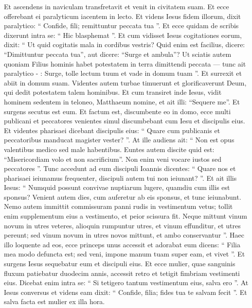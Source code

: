 \begin{biblechapter}
\begin{biblechapter}
\begin{biblechapter}
\begin{biblechapter}
\begin{biblechapter}
\begin{biblechapter}
\begin{biblechapter}
\begin{biblechapter}
\begin{biblechapter}
\verse Et ascendens in naviculam transfretavit et venit in civitatem suam. 
 \verse Et ecce offerebant ei paralyticum iacentem in lecto. Et videns Iesus fidem illorum, dixit paralytico: “ Confide, fili; remittuntur peccata tua ”. 
\verse Et ecce quidam de scribis dixerunt intra se: “ Hic blasphemat ”. 
\verse Et cum vidisset Iesus cogitationes eorum, dixit: “ Ut quid cogitatis mala in cordibus vestris? 
\verse Quid enim est facilius, dicere: “Dimittuntur peccata tua”, aut dicere: “Surge et ambula”? 
\verse Ut sciatis autem quoniam Filius hominis habet potestatem in terra dimittendi peccata — tunc ait paralytico - : Surge, tolle lectum tuum et vade in domum tuam ”. 
\verse Et surrexit et abiit in domum suam. 
 \verse Videntes autem turbae timuerunt et glorificaverunt Deum, qui dedit potestatem talem hominibus.
 \verse Et cum transiret inde Iesus, vidit hominem sedentem in teloneo, Matthaeum nomine, et ait illi: “Sequere me”. Et surgens secutus est eum.
 \verse Et factum est, discumbente eo in domo, ecce multi publicani et peccatores venientes simul discumbebant cum Iesu et discipulis eius. 
\verse Et videntes pharisaei dicebant discipulis eius: “ Quare cum publicanis et peccatoribus manducat magister vester? ”. 
\verse At ille audiens ait: “ Non est opus valentibus medico sed male habentibus.
 \verse Euntes autem discite quid est: “Misericordiam volo et non sacrificium”. Non enim veni vocare iustos sed peccatores ”.
 \verse Tunc accedunt ad eum discipuli Ioannis dicentes: “ Quare nos et pharisaei ieiunamus frequenter, discipuli autem tui non ieiunant? ”. 
\verse Et ait illis Iesus: “ Numquid possunt convivae nuptiarum lugere, quamdiu cum illis est sponsus? Venient autem dies, cum auferetur ab eis sponsus, et tunc ieiunabunt. 
\verse Nemo autem immittit commissuram panni rudis in vestimentum vetus; tollit enim supplementum eius a vestimento, et peior scissura fit. 
\verse Neque mittunt vinum novum in utres veteres, alioquin rumpuntur utres, et vinum effunditur, et utres pereunt; sed vinum novum in utres novos mittunt, et ambo conservantur ”.
 \verse Haec illo loquente ad eos, ecce princeps unus accessit et adorabat eum dicens: “ Filia mea modo defuncta est; sed veni, impone manum tuam super eam, et vivet ”. 
\verse Et surgens Iesus sequebatur eum et discipuli eius.
 \verse Et ecce mulier, quae sanguinis fluxum patiebatur duodecim annis, accessit retro et tetigit fimbriam vestimenti eius. 
\verse Dicebat enim intra se: “ Si tetigero tantum vestimentum eius, salva ero ”. 
\verse At Iesus conversus et videns eam dixit: “ Confide, filia; fides tua te salvam fecit ”. Et salva facta est mulier ex illa hora.

\end{biblechapter}
\end{biblechapter}
\end{biblechapter}
\end{biblechapter}
\end{biblechapter}
\end{biblechapter}
\end{biblechapter}
\end{biblechapter}
\end{biblechapter}
